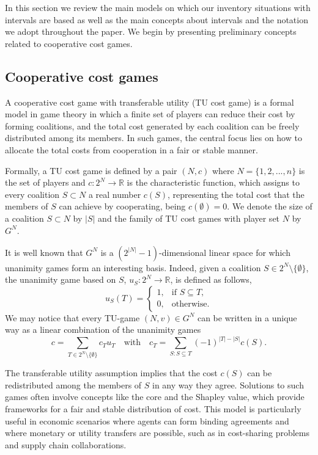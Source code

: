 \documentclass[12pt]{article}
\begin{document}
\noindent In this section we review the main models on which our inventory situations with intervals are based as well as the main concepts about intervals and the notation we adopt throughout the paper. We begin by presenting preliminary concepts related to cooperative cost games. 

\subsection{Cooperative cost games}\label{CCG} 

\noindent A cooperative cost game with transferable utility (TU cost game) is a formal model in game theory in which a finite set of players can reduce their cost by forming coalitions, and the total cost generated by each coalition can be freely distributed among its members. In such games, the central focus lies on how to allocate the total costs from cooperation in a fair or stable manner.

\noindent Formally, a TU cost game is defined by a pair $(N,c)$ where $N=\{1,2,...,n\}$ is the set of players and $c:2^{N}\rightarrow \mathbb{R}$ is the characteristic function, which assigns to every coalition $S\subset N$ a real number $c(S)$, representing the total cost that the members of $S$ can achieve by cooperating, being  $c(\emptyset )=0$. We denote the size of a coalition $S\subset N$ by $|S|$ and the family of TU cost games with player set $N$ by $G^{N}$. 

\noindent It is well known that $G^{N}$ is a $(2^{|N|}-1)$-dimensional linear space for which unanimity games form an interesting basis. Indeed, given a coalition $S\in 2^{N}\setminus \{\emptyset \}$, the unanimity game based
on $S$, $u_{S}:2^{N}\rightarrow \mathbb{R}$, is defined as follows,
\begin{equation*}
u_{S}(T)=%
\begin{cases}
1, & \text{if }S\subseteq T, \\ 
0, & \text{otherwise}.%
\end{cases}%
\end{equation*}%
\noindent We may notice that every TU-game $(N,v)\in G^{N}$ can be written in a
unique way as a linear combination of the unanimity games
\begin{equation*}
c=\sum_{T\in 2^{N}\setminus \{\emptyset \}}c_{T}u_{T}\quad \text{with}\quad
c_{T}=\sum_{S:S\subseteq T}(-1)^{|T|-|S|}c(S).
\end{equation*}

\noindent The transferable utility assumption implies that the cost $c(S)$ can be redistributed among the members of $S$ in any way they agree. Solutions to such games often involve concepts like the core and the Shapley value, which provide frameworks for a fair and stable distribution of cost. This model is particularly useful in economic scenarios where agents can form binding agreements and where monetary or utility transfers are possible, such as in cost-sharing problems and supply chain collaborations. 
\end{document}

